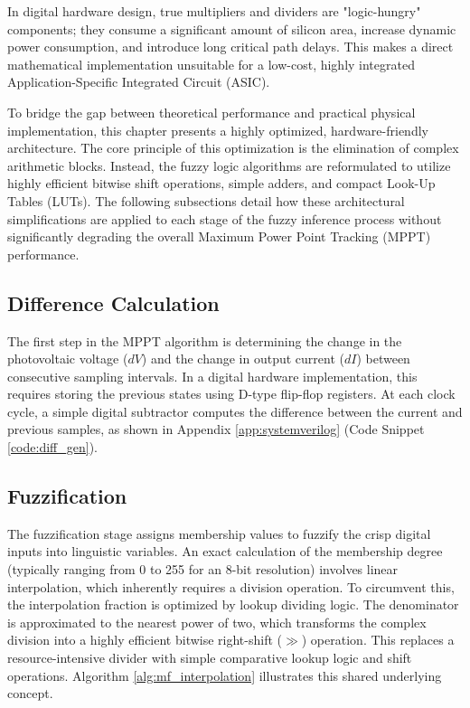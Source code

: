 \documentclass[a4paper,oneside,12pt]{report}
\numberwithin{equation}{chapter}
\begin{document}
In digital hardware design, true multipliers and dividers are "logic-hungry" components; they consume a significant amount of silicon area, increase dynamic power consumption, and introduce long critical path delays. This makes a direct mathematical implementation unsuitable for a low-cost, highly integrated Application-Specific Integrated Circuit (ASIC).

To bridge the gap between theoretical performance and practical physical implementation, this chapter presents a highly optimized, hardware-friendly architecture. The core principle of this optimization is the elimination of complex arithmetic blocks. Instead, the fuzzy logic algorithms are reformulated to utilize highly efficient bitwise shift operations, simple adders, and compact Look-Up Tables (LUTs). The following subsections detail how these architectural simplifications are applied to each stage of the fuzzy inference process without significantly degrading the overall Maximum Power Point Tracking (MPPT) performance.

\subsection{Difference Calculation}
The first step in the MPPT algorithm is determining the change in the photovoltaic voltage ($dV$) and the change in output current ($dI$) between consecutive sampling intervals. In a digital hardware implementation, this requires storing the previous states using D-type flip-flop registers. At each clock cycle, a simple digital subtractor computes the difference between the current and previous samples, as shown in Appendix \ref{app:systemverilog} (Code Snippet \ref{code:diff_gen}).

\subsection{Fuzzification}
The fuzzification stage assigns membership values to fuzzify the crisp digital inputs into linguistic variables. An exact calculation of the membership degree (typically ranging from 0 to 255 for an 8-bit resolution) involves linear interpolation, which inherently requires a division operation. To circumvent this, the interpolation fraction is optimized by lookup dividing logic. The denominator is approximated to the nearest power of two, which transforms the complex division into a highly efficient bitwise right-shift ($\gg$) operation. This replaces a resource-intensive divider with simple comparative lookup logic and shift operations. Algorithm \ref{alg:mf_interpolation} illustrates this shared underlying concept.
\end{document}
